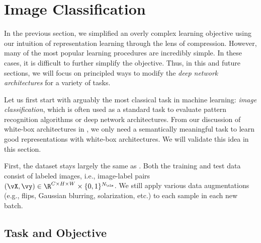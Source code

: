 \documentclass[../../book-main.tex]{subfiles}
\begin{document}
\section{Image Classification}\label{sec:image_classification}

In the previous section, we simplified an overly complex learning objective using our intuition of representation learning through the lens of compression. However, many of the most popular learning procedures are incredibly simple. In these cases, it is difficult to further simplify the objective. Thus, in this and future sections, we will focus on principled ways to modify the \textit{deep network architectures} for a variety of tasks.

Let us first start with arguably the most classical task in machine learning: \textit{image classification}, which is often used as a standard task to evaluate pattern recognition algorithms or deep network architectures. From our discussion of white-box architectures in , we only need a semantically meaningful task to learn good representations with white-box architectures. We will validate this idea in this section.

First, the dataset stays largely the same as . Both the training and test data consist of labeled images, i.e., image-label pairs \((\vX, \vy) \in \R^{C \times H \times W} \times \{0, 1\}^{N_{\cls}}\). We still apply various data augmentations (e.g., flips, Gaussian blurring, solarization, etc.) to each sample in each new batch. 

\subsection{Task and Objective} \label{sub:image_classification_objective}
\end{document}
